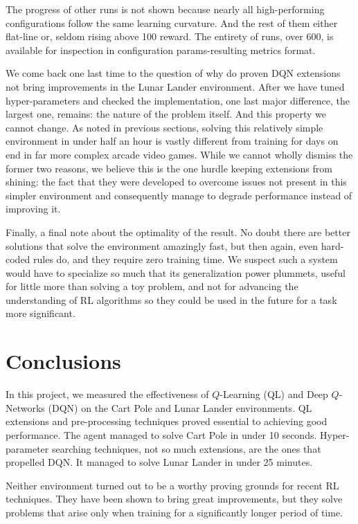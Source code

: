 \documentclass{article}
\begin{document}
The progress of other runs is not shown because nearly all high-performing configurations follow the same learning curvature. And the rest of them either flat-line or, seldom rising above 100 reward. The entirety of runs, over 600, is available for inspection in configuration params-resulting metrics format.

We come back one last time to the question of why do proven DQN extensions not bring improvements in the Lunar Lander environment. After we have tuned hyper-parameters and checked the implementation, one last major difference, the largest one, remains: the nature of the problem itself. And this property we cannot change. As noted in previous sections, solving this relatively simple environment in under half an hour is vastly different from training for days on end in far more complex arcade video games. While we cannot wholly dismiss the former two reasons, we believe this is the one hurdle keeping extensions from shining: the fact that they were developed to overcome issues not present in this simpler environment and consequently manage to degrade performance instead of improving it.

Finally, a final note about the optimality of the result. No doubt there are better solutions that solve the environment amazingly fast, but then again, even hard-coded rules do, and they require zero training time. We suspect such a system would have to specialize so much that its generalization power plummets, useful for little more than solving a toy problem, and not for advancing the understanding of RL algorithms so they could be used in the future for a task more significant.


\section{Conclusions}
\label{sec:concl}

In this project, we measured the effectiveness of $Q$-Learning (QL) and Deep $Q$-Networks (DQN) on the Cart Pole and Lunar Lander environments. QL extensions and pre-processing techniques proved essential to achieving good performance. The agent managed to solve Cart Pole in under 10 seconds. Hyper-parameter searching techniques, not so much extensions, are the ones that propelled DQN. It managed to solve Lunar Lander in under 25 minutes.

Neither environment turned out to be a worthy proving grounds for recent RL techniques. They have been shown to bring great improvements, but they solve problems that arise only when training for a significantly longer period of time.
\end{document}
